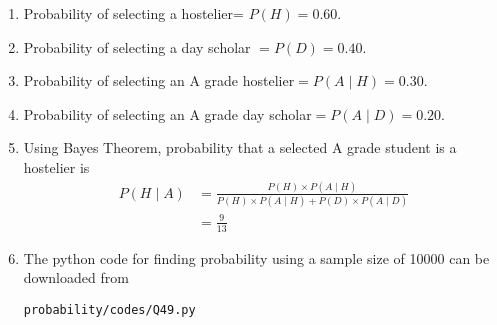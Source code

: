 \renewcommand{\theequation}{\theenumi}
\begin{enumerate}[label=\thesection.\arabic*.,ref=\thesection.\theenumi]
\item Probability of selecting a hostelier= $P(H) = 0.60$.
\item Probability of selecting a day scholar $= P(D) = 0.40$.
\item Probability of selecting an A grade hostelier$= P(A \mid H) = 0.30$.
\item Probability of selecting an A grade day scholar$= P(A \mid D) = 0.20$. 
\item Using Bayes Theorem, probability that a selected A grade student is a hostelier is
\begin{align}
P(H \mid A) &= \frac{P(H)\times P(A \mid H)}{P(H)\times P(A \mid H) + P(D)\times P(A \mid D)}\\
&= \frac{9}{13}
\end{align}
\item The python code for finding probability using a sample size of 10000 can be downloaded from
\begin{lstlisting}
probability/codes/Q49.py
\end{lstlisting}
\end{enumerate}